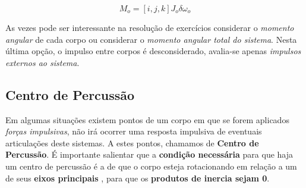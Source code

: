 $$ \boxed{M_o = [i,j,k]J_o\delta\omega_o}  $$

As vezes pode ser interessante na resolução de exercícios considerar o \textit{momento angular} de cada corpo ou considerar o \textit{momento angular total do sistema}. Nesta última opção, o impulso entre corpos é desconsiderado, avalia-se apenas \textit{impulsos externos ao sistema}.

\subsection{Centro de Percussão}

Em algumas situações existem pontos de um corpo em que se forem aplicados \textit{forças impulsivas}, não irá ocorrer uma resposta impulsiva de eventuais articulações deste sistemas. A estes pontos, chamamos de \textbf{Centro de Percussão}. É importante salientar que a \textbf{condição necessária} para que haja um centro de percussão é a de que o corpo esteja rotacionando em relação a um de seus \textbf{eixos principais }, para que os \textbf{produtos de inercia sejam 0}.



